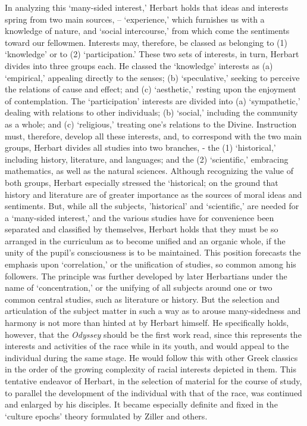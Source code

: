\documentclass[]{book}
\begin{document}
In analyzing this `many-sided interest,' Herbart holds that ideas and interests spring from two main sources, -- `experience,' which furnishes us with a knowledge of nature, and `social intercourse,' from which come the sentiments toward our fellowmen. Interests may, therefore, be classed as belonging to (1) `knowledge' or to (2) `participation.' These two sets of interests, in turn, Herbart divides into three groups each. He classed the `knowledge' interests as (a) `empirical,' appealing directly to the senses; (b) `speculative,' seeking to perceive the relations of cause and effect; and (c) `aesthetic,' resting upon the enjoyment of contemplation. The `participation' interests are divided into (a) `sympathetic,' dealing with relations to other individuals; (b) `social,' including the community as a whole; and (c) `religious,' treating one's relations to the Divine. Instruction must, therefore, develop all these interests, and, to correspond with the two main groups, Herbart divides all studies into two branches, - the (1) `historical,' including history, literature, and languages; and the (2) `scientific,' embracing mathematics, as well as the natural sciences. Although recognizing the value of both groups, Herbart especially stressed the `historical; on the ground that history and literature are of greater importance as the sources of moral ideas and sentiments. But, while all the subjects, 'historical' and `scientific,' are needed for a `many-sided interest,' and the various studies have for convenience been separated and classified by themselves, Herbart holds that they must be so arranged in the curriculum as to become unified and an organic whole, if the unity of the pupil's consciousness is to be maintained. This position forecasts the emphasis upon `correlation,' or the unification of studies, so common among his followers. The principle was further developed by later Herbartians under the name of `concentration,' or the unifying of all subjects around one or two common central studies, such as literature or history. But the selection and articulation of the subject matter in such a way as to arouse many-sidedness and harmony is not more than hinted at by Herbart himself. He specifically holds, however, that the \emph{Odyssey} should be the first work read, since this represents the interests and activities of the race while in its youth, and would appeal to the individual during the same stage. He would follow this with other Greek classics in the order of the growing complexity of racial interests depicted in them. This tentative endeavor of Herbart, in the selection of material for the course of study, to parallel the development of the individual with that of the race, was continued and enlarged by his disciples. It became especially definite and fixed in the `culture epochs' theory formulated by Ziller and others.
\end{document}

